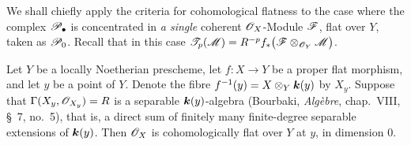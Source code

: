 We shall chiefly apply the criteria for cohomological
flatness to the case where the complex $\mathscr{P}_\bullet$ is
concentrated in \emph{a single} coherent
$\mathscr{O}_X$-Module $\mathscr{F}$, flat over $Y$, taken as
$\mathscr{P}_0$.  Recall that in this case $\mathscr{T}_p(\mathscr{M})
=R^{-p}f_*
\bigl(\mathscr{F}\otimes_{\mathscr{O}_Y}\mathscr{M}\bigr)$.

\begin{proposition}[7.8.6]
\label{III.7.8.6}
Let $Y$ be a locally Noetherian prescheme, let
$f:X\to Y$ be a proper flat morphism, and let $y$ be a point
of $Y$.  Denote the fibre
$f^{-1}(y)=X\otimes_Y\boldsymbol{k}(y)$ by $X_y$.  Suppose that $\Gamma(X_y,\mathscr{O}_{X_y})=R$
is a separable $\boldsymbol{k}(y)$-algebra \textup{(Bourbaki,
\emph{Alg\`ebre}, chap.~VIII, \S~7, no.~5)}, that is, a
direct sum of finitely many finite-degree separable
extensions of $\boldsymbol{k}(y)$.  Then $\mathscr{O}_X$ is
cohomologically flat over $Y$ at $y$, in dimension $0$.
\end{proposition}

